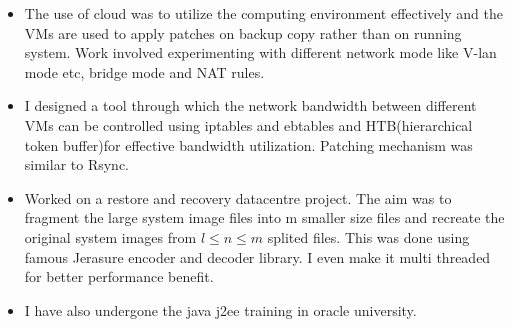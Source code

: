 \documentclass[]{res}
\newcommand{\resitem}[1]{\item #1 \vspace{-2pt}}
\begin{document}
\begin{description}
\begin{itemize}
\item The use of cloud was to utilize the computing environment effectively and the VMs are used to apply patches on backup copy rather than on running system. Work involved experimenting with different network mode like V-lan mode etc, bridge mode and NAT rules. 



\item  I designed a tool through which the network bandwidth between different VMs can be controlled using iptables and ebtables and HTB(hierarchical token buffer)for effective bandwidth utilization. Patching mechanism was similar to Rsync.  



\resitem{ Worked on a restore and recovery datacentre project. The aim was to fragment the  large system image files into m smaller size files and recreate the original system images from  $l \leq{ n} \leq{ m}$ splited files. This was done using famous Jerasure encoder and decoder library. I even make it multi threaded for better performance benefit.}   





\resitem{  I have also undergone the java j2ee training in oracle university. }   

\end {itemize}

\end{description}
\end{document}
